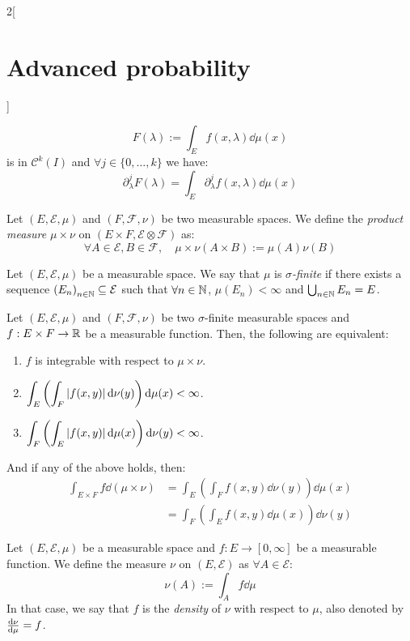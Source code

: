 \documentclass[../../../main_math.tex]{subfiles}
\begin{document}
\begin{multicols}{2}[\section{Advanced probability}]
\begin{proposition}
    $$
      F(\lambda):=\int_E{f(x,\lambda)\dd{\mu(x)}}
    $$
    is in $\mathcal{C}^k(I)$ and $\forall j\in\{0,\ldots,k\}$ we have:
    $$
      \partial_\lambda^j F(\lambda)=\int_E{\partial_\lambda^j f(x,\lambda)\dd{\mu(x)}}
    $$
  \end{proposition}
  \begin{definition}
    Let $(E,\mathcal{E},\mu)$ and $(F,\mathcal{F},\nu)$ be two measurable spaces. We define the \emph{product measure} $\mu\times\nu$ on $(E\times F,\mathcal{E}\otimes\mathcal{F})$ as:
    $$
      \forall A\in\mathcal{E}, B\in\mathcal{F}, \quad \mu\times\nu(A\times B):=\mu(A)\nu(B)
    $$
  \end{definition}
  \begin{definition}
    Let $(E,\mathcal{E},\mu)$ be a measurable space. We say that $\mu$ is \emph{$\sigma$-finite} if there exists a sequence ${(E_n)}_{n\in\mathbb{N}}\subseteq \mathcal{E}$ such that $\forall n\in\mathbb{N}$, $\mu(E_n)<\infty$ and $\bigcup_{n\in\mathbb{N}}{E_n}=E$.
  \end{definition}
  \begin{theorem}[Fubini]
    Let $(E,\mathcal{E},\mu)$ and $(F,\mathcal{F},\nu)$ be two $\sigma$-finite measurable spaces and $f:E\times F\to \mathbb{R}$ be a measurable function. Then, the following are equivalent:
    \begin{enumerate}
      \item $f$ is integrable with respect to $\mu\times\nu$.
      \item $\displaystyle\int_E{\left(\int_F{\abs{f(x,y)}\dd{\nu(y)}}\right)\dd{\mu(x)}}<\infty$.
      \item $\displaystyle\int_F{\left(\int_E{\abs{f(x,y)}\dd{\mu(x)}}\right)\dd{\nu(y)}}<\infty$.
    \end{enumerate}
    And if any of the above holds, then:
    \begin{align*}
      \int_{E\times F}{f\dd{(\mu\times\nu)}} & =\int_E{\left(\int_F{f(x,y)\dd{\nu(y)}}\right)\dd{\mu(x)}} \\
                                             & =\int_F{\left(\int_E{f(x,y)\dd{\mu(x)}}\right)\dd{\nu(y)}}
    \end{align*}
  \end{theorem}
  \begin{definition}
    Let $(E,\mathcal{E},\mu)$ be a measurable space and $f:E\to [0,\infty]$ be a measurable function. We define the measure $\nu$ on $(E,\mathcal{E})$ as $\forall A\in\mathcal{E}$:
    $$
      \nu(A):=\int_A{f\dd{\mu}}
    $$
    In that case, we say that $f$ is the \emph{density} of $\nu$ with respect to $\mu$, also denoted by $\dv{\nu}{\mu}=f$.

\end{definition}
\end{multicols}
\end{document}

